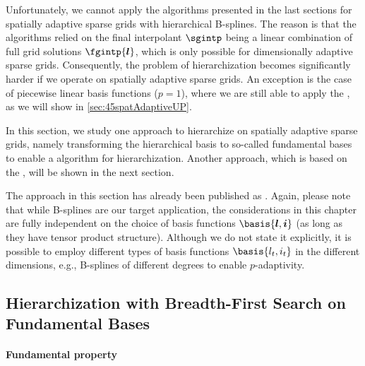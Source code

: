 \label{sec:44spatAdaptiveBFS}

Unfortunately, we cannot apply the algorithms presented in the last
sections for spatially adaptive sparse grids with
hierarchical B-splines.
The reason is that the algorithms relied on the final interpolant $\sgintp$
being a linear combination of full grid solutions $\fgintp{\*l}$,
which is only possible for dimensionally adaptive sparse grids.
Consequently, the problem of hierarchization becomes significantly
harder if we operate on spatially adaptive sparse grids.
An exception is the case of piecewise linear basis functions ($p = 1$),
where we are still able to apply the \up,
as we will show in \cref{sec:45spatAdaptiveUP}.

In this section, we study one approach to hierarchize on
spatially adaptive sparse grids,
namely transforming the hierarchical basis to so-called fundamental bases
to enable a \bfs algorithm for hierarchization.
Another approach, which is based on the \up, will be shown in the next section.

The approach in this section has already been published as
\cite{Valentin18Fundamental}.
Again, please note that while B-splines are our target application,
the considerations in this chapter are fully independent on the choice of
basis functions $\basis{\*l,\*i}$ 
(as long as they have tensor product structure).
Although we do not state it explicitly, it is possible to employ
different types of basis functions $\basis{l_t,i_t}$ in the different
dimensions, e.g., B-splines of different degrees to enable $p$-adaptivity.

\subsection{Hierarchization with Breadth-First Search on Fundamental Bases}
\label{sec:441BFSFundamentalBases}

\paragraph{Fundamental property}

